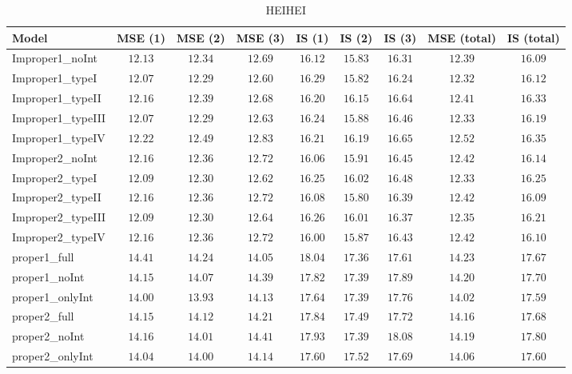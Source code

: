 \begin{table}

\caption{\label{tab:model-choice-sc9}HEIHEI}
\centering
\begin{tabular}{lcccccccc}
\hline
Model  & MSE (1) & MSE (2) & MSE (3) & IS (1) & IS (2) & IS (3) & MSE (total) & \multicolumn{1}{c}{IS (total)} \\ 
\hline
Improper1_noInt  & $12.13$ & $12.34$ & $12.69$ & $16.12$ & $15.83$ & $16.31$ & $12.39$ & $16.09$ \\
Improper1_typeI  & $12.07$ & $12.29$ & $12.60$ & $16.29$ & $15.82$ & $16.24$ & $12.32$ & $16.12$ \\
Improper1_typeII  & $12.16$ & $12.39$ & $12.68$ & $16.20$ & $16.15$ & $16.64$ & $12.41$ & $16.33$ \\
Improper1_typeIII  & $12.07$ & $12.29$ & $12.63$ & $16.24$ & $15.88$ & $16.46$ & $12.33$ & $16.19$ \\
Improper1_typeIV  & $12.22$ & $12.49$ & $12.83$ & $16.21$ & $16.19$ & $16.65$ & $12.52$ & $16.35$ \\
Improper2_noInt  & $12.16$ & $12.36$ & $12.72$ & $16.06$ & $15.91$ & $16.45$ & $12.42$ & $16.14$ \\
Improper2_typeI  & $12.09$ & $12.30$ & $12.62$ & $16.25$ & $16.02$ & $16.48$ & $12.33$ & $16.25$ \\
Improper2_typeII  & $12.16$ & $12.36$ & $12.72$ & $16.08$ & $15.80$ & $16.39$ & $12.42$ & $16.09$ \\
Improper2_typeIII  & $12.09$ & $12.30$ & $12.64$ & $16.26$ & $16.01$ & $16.37$ & $12.35$ & $16.21$ \\
Improper2_typeIV  & $12.16$ & $12.36$ & $12.72$ & $16.00$ & $15.87$ & $16.43$ & $12.42$ & $16.10$ \\
proper1_full  & $14.41$ & $14.24$ & $14.05$ & $18.04$ & $17.36$ & $17.61$ & $14.23$ & $17.67$ \\
proper1_noInt  & $14.15$ & $14.07$ & $14.39$ & $17.82$ & $17.39$ & $17.89$ & $14.20$ & $17.70$ \\
proper1_onlyInt  & $14.00$ & $13.93$ & $14.13$ & $17.64$ & $17.39$ & $17.76$ & $14.02$ & $17.59$ \\
proper2_full  & $14.15$ & $14.12$ & $14.21$ & $17.84$ & $17.49$ & $17.72$ & $14.16$ & $17.68$ \\
proper2_noInt  & $14.16$ & $14.01$ & $14.41$ & $17.93$ & $17.39$ & $18.08$ & $14.19$ & $17.80$ \\
proper2_onlyInt  & $14.04$ & $14.00$ & $14.14$ & $17.60$ & $17.52$ & $17.69$ & $14.06$ & $17.60$ \\
\hline 
\end{tabular}


\end{table}